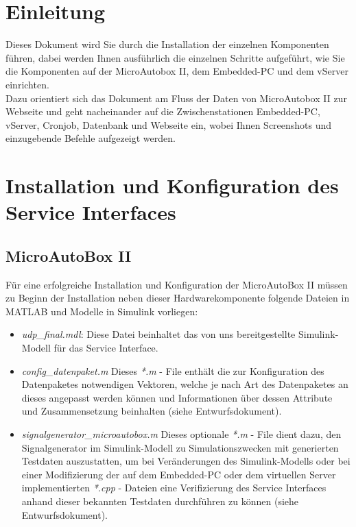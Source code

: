 \documentclass[fontsize = 12pt, paper = a4]{scrreprt}
\begin{document}
\chapter{Einleitung}

Dieses Dokument wird Sie durch die Installation der 
einzelnen Komponenten führen, dabei werden Ihnen ausführlich 
die einzelnen Schritte aufgeführt, wie Sie die Komponenten 
auf der MicroAutobox II, dem Embedded-PC und dem vServer 
einrichten. \\ 

Dazu orientiert sich das Dokument am Fluss der 
Daten von MicroAutobox II zur Webseite und geht nacheinander 
auf die Zwischenstationen Embedded-PC, vServer, Cronjob, 
Datenbank und Webseite ein, wobei Ihnen Screenshots und 
einzugebende Befehle aufgezeigt werden.


\chapter{Installation und Konfiguration des Service Interfaces}



\section{MicroAutoBox II}

Für eine erfolgreiche Installation und Konfiguration der MicroAutoBox II müssen zu Beginn der Installation neben dieser Hardwarekomponente folgende Dateien in MATLAB und Modelle in Simulink vorliegen:

\begin{itemize}

\item \textit{udp\_final.mdl}: Diese Datei beinhaltet das von uns bereitgestellte Simulink-Modell für das Service Interface.

\item \textit{config\_datenpaket.m} Dieses \textit{*.m} - File enthält die zur Konfiguration des Datenpaketes notwendigen Vektoren, welche je nach Art des Datenpaketes an dieses angepasst werden können und Informationen über dessen Attribute und Zusammensetzung beinhalten (siehe Entwurfsdokument).

\item \textit{signalgenerator\_microautobox.m} Dieses optionale \textit{*.m} - File dient dazu, den Signalgenerator im Simulink-Modell zu Simulationszwecken mit generierten Testdaten auszustatten, um bei Veränderungen des Simulink-Modells oder bei einer Modifizierung der   auf dem Embedded-PC oder dem virtuellen Server implementierten \textit{*.cpp} - Dateien eine Verifizierung des Service Interfaces anhand dieser bekannten Testdaten durchführen zu können (siehe Entwurfsdokument).

\end{itemize} 
\end{document}
